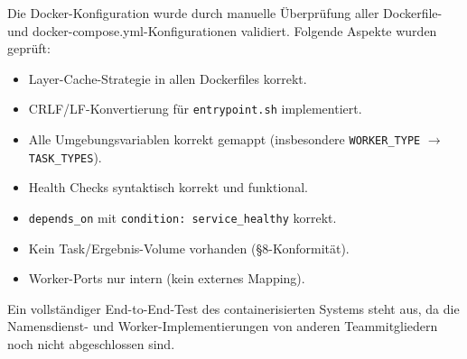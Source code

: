 Die Docker-Konfiguration wurde durch manuelle
Überprüfung aller Dockerfile- und docker-compose.yml-Konfigurationen
validiert.
Folgende Aspekte wurden geprüft:

\begin{itemize}
  \item Layer-Cache-Strategie in allen Dockerfiles korrekt.
  \item CRLF/LF-Konvertierung für \texttt{entrypoint.sh} implementiert.
  \item Alle Umgebungsvariablen korrekt gemappt
        (insbesondere \texttt{WORKER\_TYPE} $\rightarrow$ \texttt{TASK\_TYPES}).
  \item Health Checks syntaktisch korrekt und funktional.
  \item \texttt{depends\_on} mit \texttt{condition: service\_healthy} korrekt.
  \item Kein Task/Ergebnis-Volume vorhanden (§8-Konformität).
  \item Worker-Ports nur intern (kein externes Mapping).
\end{itemize}

Ein vollständiger End-to-End-Test des containerisierten Systems steht aus, da die Namensdienst-
und Worker-Implementierungen von anderen Teammitgliedern noch
nicht abgeschlossen sind.
